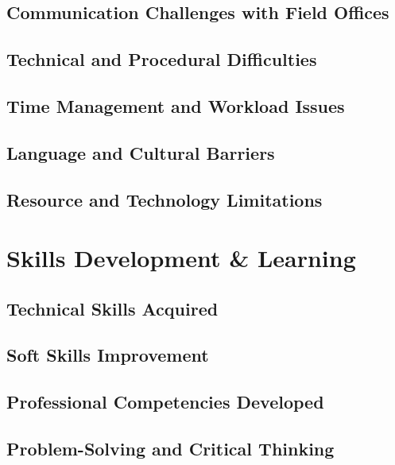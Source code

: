 \subsection{Communication Challenges with Field Offices}

\subsection{Technical and Procedural Difficulties}

\subsection{Time Management and Workload Issues}

\subsection{Language and Cultural Barriers}

\subsection{Resource and Technology Limitations}

\section{Skills Development \& Learning}

\subsection{Technical Skills Acquired}

\subsection{Soft Skills Improvement}

\subsection{Professional Competencies Developed}

\subsection{Problem-Solving and Critical Thinking}

